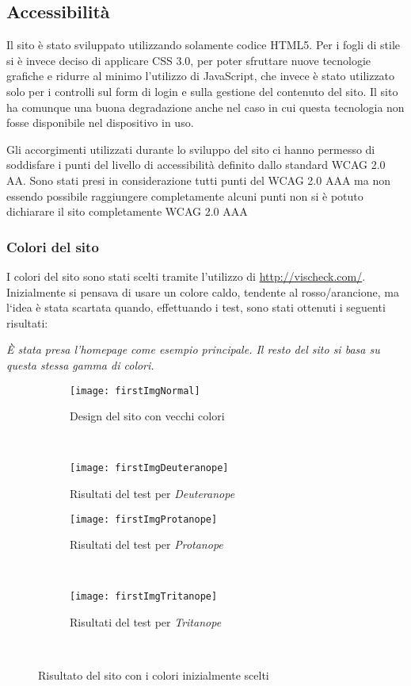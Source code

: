 \graphicspath{ {res/img/} }

\subsection{Accessibilità}
Il sito è stato sviluppato utilizzando solamente codice HTML5. Per i fogli di stile si è invece deciso di applicare CSS 3.0, per poter sfruttare nuove tecnologie grafiche e ridurre al minimo l'utilizzo di JavaScript, che invece è stato utilizzato solo per i controlli sul form di login e sulla gestione del contenuto del sito. Il sito ha comunque una buona degradazione anche nel caso in cui questa tecnologia non fosse disponibile nel dispositivo in uso.

Gli accorgimenti utilizzati durante lo sviluppo del sito ci hanno permesso di soddisfare i punti del livello di accessibilità definito dallo standard WCAG 2.0 AA. Sono stati presi in considerazione tutti punti del WCAG 2.0 AAA ma non essendo possibile raggiungere completamente alcuni punti non si è potuto dichiarare il sito completamente WCAG 2.0 AAA

\subsubsection{Colori del sito}
I colori del sito sono stati scelti tramite l'utilizzo di \url{http://vischeck.com/}. Inizialmente si pensava di usare un colore caldo, tendente al rosso/arancione, ma l`idea \`e stata scartata quando, effettuando i test, sono stati ottenuti i seguenti risultati:

\textit{\`E stata presa l'homepage come esempio principale. Il resto del sito si basa su questa stessa gamma di colori.}

\begin{figure}[H]
    \centering
    \begin{subfigure}[b]{0.45\textwidth}
        \texttt{[image: firstImgNormal]}
        \caption{Design del sito con vecchi colori}
    \end{subfigure}
    ~
    \begin{subfigure}[b]{0.45\textwidth}
        \texttt{[image: firstImgDeuteranope]}
        \caption{Risultati del test per \textit{Deuteranope}}
    \end{subfigure}
    \newline
    \begin{subfigure}[b]{0.45\textwidth}
        \texttt{[image: firstImgProtanope]}
        \caption{Risultati del test per \textit{Protanope}}
    \end{subfigure}
    ~
    \begin{subfigure}[b]{0.45\textwidth}
        \texttt{[image: firstImgTritanope]}
        \caption{Risultati del test per \textit{Tritanope}}
    \end{subfigure}
    ~
    \caption{Risultato del sito con i colori inizialmente scelti}
\end{figure}


